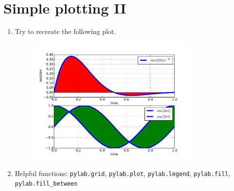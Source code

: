 \documentclass[smallheadings,12pt]{scrartcl}
\begin{document}
\section*{Simple plotting II}
\begin {enumerate}
\item Try to recreate the following plot.
\begin{figure}[H]
  \centering
  \includegraphics[width=0.8\textwidth]{pics/simple-plot-2}
\end{figure}
\item[] Helpful functions: {\tt pylab.grid}, {\tt pylab.plot}, {\tt pylab.legend}, {\tt pylab.fill}, {\tt pylab.fill\_between }
\end {enumerate}
\end{document}
